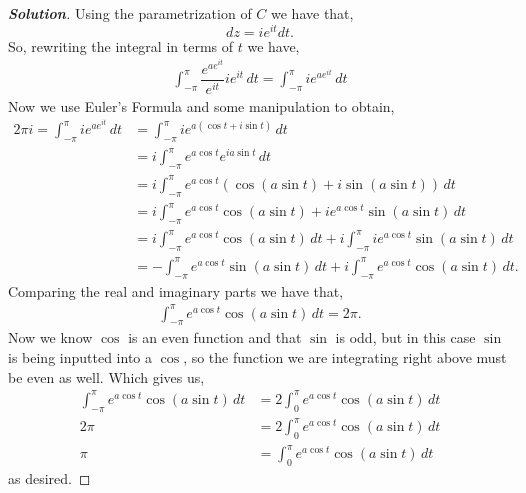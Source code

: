 \documentclass[11pt]{article}
\newenvironment{solution}{\begin{proof}[\textbf{\textit{Solution}}] }{\end{proof}}
\begin{document}
\begin{solution}
    Using the parametrization of $C$ we have that,
    \[dz = ie^{i t} d t.\]
    So, rewriting the integral in terms of $t$ we have,
    \begin{align*}
        \int_{-\pi}^{\pi}\dfrac{e^{a e^{i t}}}{e^{i t}} i e^{i t}\, d t = \int_{-\pi}^{\pi}i e^{a e^{i t}} \, d t
    \end{align*}
    Now we use Euler's Formula and some manipulation to obtain,
    \begin{align*}
       2\pi i =  \int_{-\pi}^{\pi}i e^{a e^{i t}} \, d t &= \int_{-\pi}^{\pi}i e^{a (\cos t + i \sin t )} \, d t \\
        &= i\int_{-\pi}^{\pi}e^{a\cos t} e^{i a \sin t}\, d t \\
        &= i\int_{-\pi}^{\pi}e^{a\cos t}(\cos( a \sin t) + i \sin( a \sin t ))\, d t \\
        &= i\int_{-\pi}^{\pi}e^{a \cos t}\cos( a  \sin t) + ie^{a\cos t}\sin( a \sin t)\, d t \\
        &= i\int_{-\pi}^{\pi} e^{a \cos t}\cos( a  \sin t)\, d t + i\int_{-\pi}^{\pi} ie^{a\cos t}\sin( a  \sin t)\, d t \\
        &= -\int_{-\pi}^{\pi}e^{a \cos t}\sin( a  \sin t) \, dt + i\int_{-\pi}^{\pi}e^{a \cos t} \cos(a  \sin t)\,d t.
    \end{align*}
    Comparing the real and imaginary parts we have that,
    \begin{align*}
        \int_{-\pi}^{\pi}e^{a \cos t} \cos(a  \sin t)\,d t = 2\pi .
    \end{align*}
    Now we know $\cos$ is an even function and that $\sin$ is odd, but in this case $\sin$ is being inputted into a $\cos$, so the function we are integrating right above must be even as well. Which gives us,
    \begin{align*}
        \int_{-\pi}^{\pi}e^{a \cos t} \cos(a  \sin t)\,d t &= 2\int_0^{\pi}e^{a \cos t} \cos(a  \sin t)\,d t  \\
        2\pi &= 2\int_0^{\pi}e^{a \cos t} \cos(a  \sin t)\,d t  \\
        \pi & = \int_0^{\pi}e^{a \cos t} \cos(a  \sin t)\,d t
    \end{align*}
    as desired. 
        
\end{solution}

\newpage  %
\end{document}
